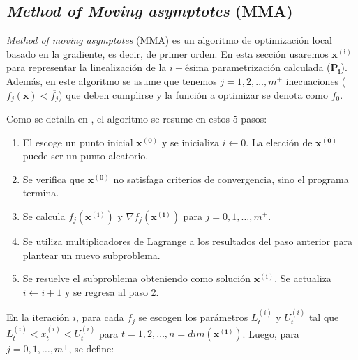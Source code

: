 

\subsection{\emph{Method of Moving asymptotes} (MMA)}\label{sec:mma}

\emph{Method of moving asymptotes} (MMA) es un algoritmo de optimización
local basado en la gradiente, es decir, de primer orden. En esta sección usaremos
$\boldsymbol{\boldsymbol{x^{(i)}}}$ para representar la linealización de la $i-$ésima parametrización 
calculada ($\boldsymbol{P_i}$). Además, en este algoritmo se asume que tenemos $j = 1, 2, \dots, m^{+}$ inecuaciones 
($f_j(\boldsymbol{x}) < \overline{f_j}$) que deben cumplirse y la función a optimizar se denota como $f_0$.


Como se detalla en \cite{Svanberg1987}, el algoritmo se resume en estos 5 pasos:


\begin{enumerate}

  \item El escoge un punto inicial $\boldsymbol{x^{(0)}}$ y se inicializa $i \gets 0$.
    La elección de $\boldsymbol{x^{(0)}}$ puede ser un punto aleatorio.

  \item Se verifica que $\boldsymbol{x^{(0)}}$ no satisfaga criterios de convergencia, sino el programa
    termina.

  \item Se calcula $f_j(\boldsymbol{x^{(i)}})$ y $\nabla f_j(\boldsymbol{x^{(i)}})$ para $j = 0, 1, \dots, m^{+}$.

  \item Se utiliza multiplicadores de Lagrange a los resultados del paso anterior para plantear un
    nuevo subproblema.

  \item Se resuelve el subproblema obteniendo como solución $\boldsymbol{x^{(i)}}$.
        Se actualiza $i \gets i + 1$ y se regresa al paso 2.

\end{enumerate}

En la iteración $i$, para cada $f_j$ se escogen los parámetros
$L_t^{(i)}$ y $U_t^{(i)}$ tal que $L_t^{(i)} < x_t^{(i)} < U_t^{(i)}$ para $t = 1, 2, \dots,
n = dim(\boldsymbol{x^{(i)}})$. Luego, para $j = 0, 1, \dots, m^{+}$, se define:

